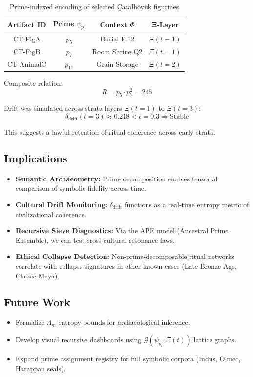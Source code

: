 \documentclass[12]{amsart}
\theoremstyle{plain}
\begin{document}
\begin{table}[H]
\centering
\begin{tabular}{|c|c|c|c|}
\hline
\textbf{Artifact ID} & \textbf{Prime $\psi_{p_i}$} & \textbf{Context $\Phi$} & \textbf{Ξ-Layer} \\
\hline
CT-FigA & $p_5$ & Burial F.12 & $\Xi(t=1)$ \\
CT-FigB & $p_7$ & Room Shrine Q2 & $\Xi(t=1)$ \\
CT-AnimalC & $p_{11}$ & Grain Storage & $\Xi(t=2)$ \\
\hline
\end{tabular}
\caption{Prime-indexed encoding of selected Çatalhöyük figurines}
\end{table}

Composite relation:
\[
R = p_5 \cdot p_7^2 = 245
\]

Drift was simulated across strata layers $\Xi(t=1)$ to $\Xi(t=3)$:
\[
\delta_{\text{drift}}(t=3) \approx 0.218 < \epsilon = 0.3 \Rightarrow \text{Stable}
\]

This suggests a lawful retention of ritual coherence across early strata.

\subsection{Implications}

\begin{itemize}
    \item \textbf{Semantic Archaeometry:} Prime decomposition enables tensorial comparison of symbolic fidelity across time.
    \item \textbf{Cultural Drift Monitoring:} $δ_{\text{drift}}$ functions as a real-time entropy metric of civilizational coherence.
    \item \textbf{Recursive Sieve Diagnostics:} Via the APE model (Ancestral Prime Ensemble), we can test cross-cultural resonance laws.
    \item \textbf{Ethical Collapse Detection:} Non-prime-decomposable ritual networks correlate with collapse signatures in other known cases (Late Bronze Age, Classic Maya).
\end{itemize}

\subsection{Future Work}
\begin{itemize}
    \item Formalize $\Lambda_m$-entropy bounds for archaeological inference.
    \item Develop visual recursive dashboards using $\mathcal{G}(\psi_{p_i}, \Xi(t))$ lattice graphs.
    \item Expand prime assignment registry for full symbolic corpora (Indus, Olmec, Harappan seals).
\end{itemize}
\end{document}
